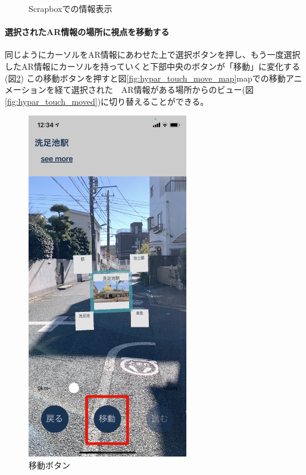 \begin{figure}[h]
\begin{minipage}{0.5\hsize}
    \caption{Scrapboxでの情報表示} \label{fig:hypar_touch_webview}
  \end{minipage}
\end{figure}

\paragraph*{選択されたAR情報の場所に視点を移動する}
同じようにカーソルをAR情報にあわせた上で選択ボタンを押し、もう一度選択したAR情報にカーソルを持っていくと下部中央のボタンが「移動」に変化する(図\ref{fig:hypar_touch_move_button})
この移動ボタンを押すと図\ref{fig:hypar_touch_move_map}mapでの移動アニメーションを経て選択された　AR情報がある場所からのビュー(図\ref{fig:hypar_touch_moved})に切り替えることができる。

\begin{figure}[h]
  \begin{minipage}{0.5\hsize}
    \centering
    \includegraphics[width=70mm]{images/hypar_touch_move_button.png}
    \caption{移動ボタン} \label{fig:hypar_touch_move_button}
  \end{minipage}
  \begin{minipage}{0.5\hsize}

\end{minipage}
\end{figure}
